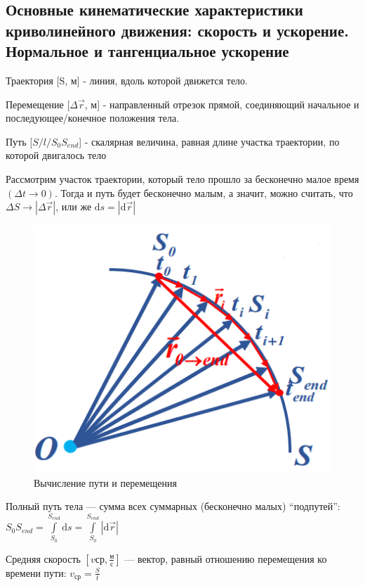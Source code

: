 \subsection{Основные кинематические характеристики криволинейного движения: скорость и ускорение. Нормальное и тангенциальное ускорение}

\begin{definition}
    Траектория [S, м] - линия, вдоль которой движется тело.
\end{definition}

\begin{definition}
    Перемещение [$\Delta\vec{r}$, м] - направленный отрезок прямой, соединяющий начальное и последующее/конечное положения тела.
\end{definition}

\begin{definition}
    Путь [$S/l/S_{0}S_{end}$] - скалярная величина, равная длине участка траектории, по которой двигалось тело
\end{definition}

Рассмотрим участок траектории, который тело прошло за бесконечно малое время $(\Delta t\to0)$. 
Тогда и путь будет бесконечно малым, а значит, можно считать, что $\Delta S\to|\Delta\vec r|$, 
или же $\mathrm{d}s=|\mathrm{d}\vec r|$

\begin{figure}[h]
    \centering
    \includegraphics[width=0.5\linewidth]{imgs/q1i1.png}
    \caption{Вычисление пути и перемещения}
    \label{q1i1}
\end{figure}

\begin{definition}
    Полный путь тела — сумма всех суммарных (бесконечно малых) “подпутей”: $S_0S_{end}=\int\limits_{S_0}^{S_{end}}\mathrm{d}s=\int\limits_{S_0}^{S_{end}}|\mathrm{d}\vec r|$
\end{definition}

\begin{definition}
    Средняя скорость $[v{ср}, \frac{м}{с}]$ — вектор, равный отношению перемещения ко времени пути: $v_{ср} = \frac{S}{t}$
\end{definition}


